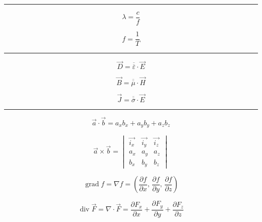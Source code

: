 \documentclass[12pt]{article}
\newcommand{\grayrule}{{\color{lightgray} \hrule}}
\begin{document}
\begin{multicols}{3}
\grayrule

\begin{equation*}
    \lambda = \frac{c}{f}
\end{equation*}

\begin{equation*}
    f = \frac{1}{T}
\end{equation*}

\grayrule

\begin{equation*}
    \Vec{D} = \overline{\overline{\varepsilon}} \cdot \Vec{E}
\end{equation*}

\begin{equation*}
    \Vec{B} = \overline{\overline{\mu}} \cdot \Vec{H}
\end{equation*}

\begin{equation*}
    \Vec{J} = \overline{\overline{\sigma}} \cdot \Vec{E}
\end{equation*}

\grayrule


\begin{equation*}
    \Vec{a} \cdot \Vec{b} = a_x b_x + a_y b_y + a_z b_z
\end{equation*}

\begin{equation*}
    \Vec{a} \times \Vec{b}
        = \begin{vmatrix}
        \Vec{i_x} & \Vec{i_y} & \Vec{i_z} \\
        a_x & a_y & a_z \\
        b_x & b_y & b_z
        \end{vmatrix}
\end{equation*}

\begin{equation*}
    \operatorname{grad} f = \nabla f = \left(
            \frac{\partial f}{\partial x},\,
            \frac{\partial f}{\partial y},\,
            \frac{\partial f}{\partial z}
        \right)
\end{equation*}

\begin{equation*}
    \operatorname{div} \Vec{F}
        = \nabla \cdot \Vec{F}
        = \frac{\partial F_x}{\partial x}
            + \frac{\partial F_y}{\partial y}
            + \frac{\partial F_z}{\partial z}
\end{equation*}


\end{multicols}
\end{document}
